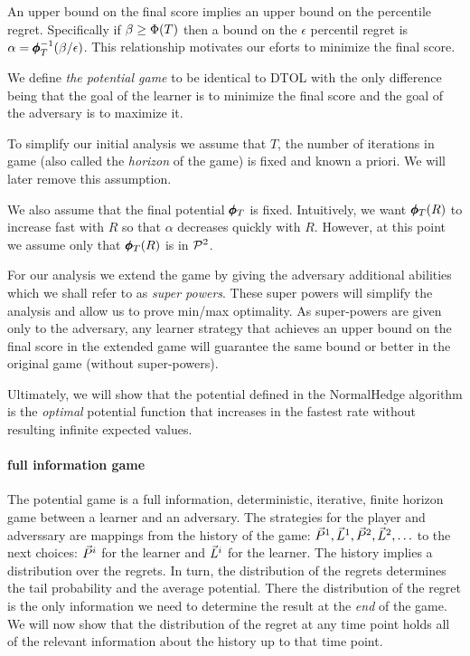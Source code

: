 \documentclass{article}[12pt]
\begin{document}
An upper bound on the final score implies an upper bound on the
percentile regret. Specifically if $\beta \geq \Phi(T)$ then a bound
on the $\epsilon$ percentil regret is
$\alpha= \pmb{\phi}_{T}^{-1}(\beta/\epsilon)$.  This relationship
motivates our eforts to minimize the final score.

We define {\em the potential game} to be identical to DTOL with the
only difference being that the goal of the learner is to minimize the
final score and the goal of the adversary is to maximize it.

To simplify our initial analysis we assume that $T$, the number of
iterations in game (also called the {\em horizon} of the game) is
fixed and known a priori.  We will later remove this assumption.

We also assume that the final potential $\pmb{\phi}_{T}$ is
fixed. Intuitively, we want $\pmb{\phi}_{T}(R)$ to increase fast with $R$
so that $\alpha$ decreases quickly with $R$. However, at this point we
assume only that $\pmb{\phi}_{T}(R)$ is in ${\cal P}^{2}$.

For our analysis we extend the game by giving the adversary additional
abilities which we shall refer to as {\em super powers}. These super
powers will simplify the analysis and allow us to prove min/max
optimality. As super-powers are given only to the adversary, any
learner strategy that achieves an upper bound on the final score in
the extended game will guarantee the same bound or better in the
original game (without super-powers).

Ultimately, we will show that the potential defined in the NormalHedge
algorithm is the {\em optimal} potential function that increases in
the fastest rate without resulting infinite expected values.

\paragraph*{full information game}
The potential game is a full information, deterministic, iterative,
finite horizon game between a learner and an adversary. The strategies
for the player and adverssary are mappings from the history of the
game: $\vec{P}^{1},\vec{L}^{1},\vec{P}^{2},\vec{L}^{2},\ldots$ to the next
choices: $\vec{P}^{i}$ for the learner and $\vec{L}^{i}$ for the learner.
The history implies a distribution over the regrets. In turn, the
distribution of the regrets determines the tail probability and the
average potential. There the distribution of the regret is the only
information we need to determine the result at the {\em end} of the
game. We will now show that the distribution of the regret at any time
point holds all of the relevant information about the history up to
that time point.
\end{document}
